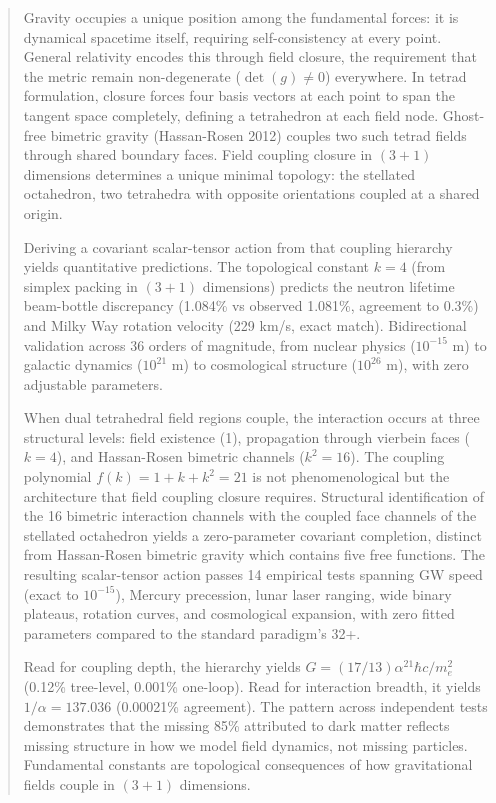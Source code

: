 \documentclass[aps,prd,preprint,superscriptaddress,showpacs,preprintnumbers,amsmath,amssymb,nofootinbib]{revtex4-2}
\begin{document}
\begin{abstract}
Gravity occupies a unique position among the fundamental forces: it is dynamical spacetime itself, requiring self-consistency at every point. General relativity encodes this through field closure, the requirement that the metric remain non-degenerate ($\det(g) \neq 0$) everywhere. In tetrad formulation, closure forces four basis vectors at each point to span the tangent space completely, defining a tetrahedron at each field node. Ghost-free bimetric gravity (Hassan-Rosen 2012) couples two such tetrad fields through shared boundary faces. Field coupling closure in $(3{+}1)$ dimensions determines a unique minimal topology: the stellated octahedron, two tetrahedra with opposite orientations coupled at a shared origin.

Deriving a covariant scalar-tensor action from that coupling hierarchy yields quantitative predictions. The topological constant $k = 4$ (from simplex packing in $(3{+}1)$ dimensions) predicts the neutron lifetime beam-bottle discrepancy (1.084\% vs observed 1.081\%, agreement to 0.3\%) and Milky Way rotation velocity (229 km/s, exact match). Bidirectional validation across 36 orders of magnitude, from nuclear physics ($10^{-15}$ m) to galactic dynamics ($10^{21}$ m) to cosmological structure ($10^{26}$ m), with zero adjustable parameters.

When dual tetrahedral field regions couple, the interaction occurs at three structural levels: field existence (1), propagation through vierbein faces ($k = 4$), and Hassan-Rosen bimetric channels ($k^2 = 16$). The coupling polynomial $f(k) = 1 + k + k^2 = 21$ is not phenomenological but the architecture that field coupling closure requires. Structural identification of the 16 bimetric interaction channels with the coupled face channels of the stellated octahedron yields a zero-parameter covariant completion, distinct from Hassan-Rosen bimetric gravity which contains five free functions. The resulting scalar-tensor action passes 14 empirical tests spanning GW speed (exact to $10^{-15}$), Mercury precession, lunar laser ranging, wide binary plateaus, rotation curves, and cosmological expansion, with zero fitted parameters compared to the standard paradigm's 32+.

Read for coupling depth, the hierarchy yields $G = (17/13)\alpha^{21} \hbar c/m_e^2$ (0.12\% tree-level, 0.001\% one-loop). Read for interaction breadth, it yields $1/\alpha = 137.036$ (0.00021\% agreement). The pattern across independent tests demonstrates that the missing 85\% attributed to dark matter reflects missing structure in how we model field dynamics, not missing particles. Fundamental constants are topological consequences of how gravitational fields couple in $(3{+}1)$ dimensions.
\end{abstract}
\end{document}
